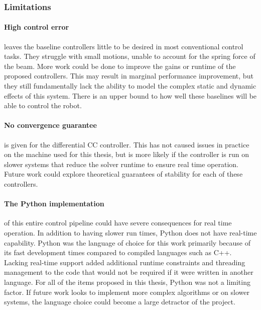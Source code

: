 \subsubsection{Limitations}
\paragraph{High control error} leaves the baseline controllers little to be desired in most conventional control tasks. They struggle with small motions, unable to account for the spring force of the beam. More work could be done to improve the gains or runtime of the proposed controllers. This may result in marginal performance improvement, but they still fundamentally lack the ability to model the complex static and dynamic effects of this system. There is an upper bound to how well these baselines will be able to control the robot. 

\paragraph{No convergence guarantee} is given for the differential CC controller. This has not caused issues in practice on the machine used for this thesis, but is more likely if the controller is run on slower systems that reduce the solver runtime to ensure real time operation. Future work could explore theoretical guarantees of stability for each of these controllers. 

\paragraph{The Python implementation} of this entire control pipeline could have severe consequences for real time operation. In addition to having slower run times, Python does not have real-time capability. Python was the language of choice for this work primarily because of its fast development times compared to compiled languages such as C++. Lacking real-time support added additional runtime constraints and threading management to the code that would not be required if it were written in another language. For all of the items proposed in this thesis, Python was not a limiting factor. If future work looks to implement more complex algorithms or on slower systems, the language choice could become a large detractor of the project. 
